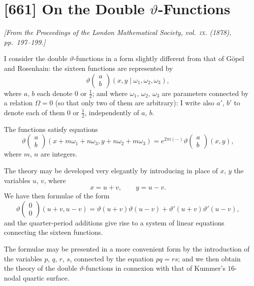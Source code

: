 \documentclass[11pt,a4paper]{article}
\theoremstyle{plain}
\theoremstyle{definition}
\newcommand{\te}{\vartheta} %
\begin{document}
\newpage
\section{[661] On the Double $\vartheta$-Functions}
\label{sec:661}

\noindent\textit{[From the \emph{Proceedings of the London Mathematical Society}, vol.~\textsc{ix}. (1878), pp.~197--199.]}

\medskip

I consider the double $\te$-functions in a form slightly different from that of G\"{o}pel and Rosenhain: the sixteen functions are represented by
\[
\te\begin{pmatrix} a \\ b \end{pmatrix}(x, y \mid \omega_1, \omega_2, \omega_3),
\]
where $a$, $b$ each denote $0$ or $\frac{1}{2}$; and where $\omega_1$, $\omega_2$, $\omega_3$ are parameters connected by a relation $\Omega = 0$ (so that only two of them are arbitrary): I write also $a'$, $b'$ to denote each of them $0$ or $\frac{1}{2}$, independently of $a$, $b$.

The functions satisfy equations
\[
\te\begin{pmatrix} a \\ b \end{pmatrix}(x + m\omega_1 + n\omega_3, y + n\omega_2 + m\omega_3) = e^{2\pi i(\cdots)} \te\begin{pmatrix} a \\ b \end{pmatrix}(x, y),
\]
where $m$, $n$ are integers.

The theory may be developed very elegantly by introducing in place of $x$, $y$ the variables $u$, $v$, where
\[
x = u + v, \qquad y = u - v.
\]
We have then formulae of the form
\[
\te\begin{pmatrix} 0 \\ 0 \end{pmatrix}(u + v, u - v) = \te(u + v) \te(u - v) + \te'(u + v) \te'(u - v),
\]
and the quarter-period additions give rise to a system of linear equations connecting the sixteen functions.

The formulae may be presented in a more convenient form by the introduction of the variables $p$, $q$, $r$, $s$, connected by the equation $pq = rs$; and we then obtain the theory of the double $\te$-functions in connexion with that of Kummer's $16$-nodal quartic surface.
\end{document}
